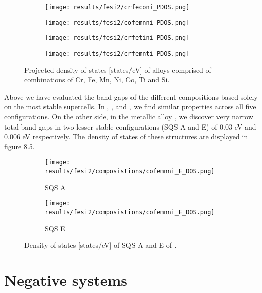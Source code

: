 \begin{figure}[H]
\begin{subfigure}{.5\textwidth}
\texttt{[image: results/fesi2/crfeconi\_PDOS.png]}
\caption{}
\end{subfigure}
\begin{subfigure}{.5\textwidth}
\texttt{[image: results/fesi2/cofemnni\_PDOS.png]}
\caption{}
\end{subfigure}
\begin{subfigure}{.5\textwidth}
\texttt{[image: results/fesi2/crfetini\_PDOS.png]}
\caption{}
\end{subfigure}
\begin{subfigure}{.5\textwidth}
\texttt{[image: results/fesi2/crfemnti\_PDOS.png]}
\caption{}
\end{subfigure}
\caption{Projected density of states [states/eV] of alloys comprised of combinations of Cr, Fe, Mn, Ni, Co, Ti and Si.}
\end{figure}

Above we have evaluated the band gaps of the different compositions based solely on the most stable supercells. In , ,  and , we find similar properties across all five configurations.  On the other side, in the metallic alloy , we discover very narrow total band gaps in two lesser stable configurations (SQS A and E) of 0.03 eV and 0.006 eV respectively. The density of states of these structures are displayed in figure 8.5.

\begin{figure}[H]
\begin{subfigure}{.5\textwidth}
\texttt{[image: results/fesi2/composistions/cofemnni\_E\_DOS.png]}
\caption{SQS A}
\end{subfigure}
\begin{subfigure}{.5\textwidth}
\texttt{[image: results/fesi2/composistions/cofemnni\_E\_DOS.png]}
\caption{SQS E}
\end{subfigure}
\caption{Density of states [states/eV] of SQS A and E of .}
\end{figure} 

\newpage
\section{Negative systems}

